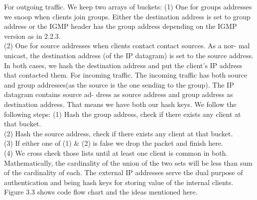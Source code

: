 \documentclass[11pt,left=2cm,bottom=2cm,oneside]{book}
\begin{document}
For outgoing traffic. We keep two arrays of buckets:
(1) One for groups addresses we snoop when clients join groups. Either the
destination address is set to group address or the IGMP header has the
group address depending on the IGMP version as in 2.2.3.\\
(2) One for source addresses when clients contact contact sources. As a nor-
mal unicast, the destination address (of the IP datagram) is set to the
source address.\\
In both cases, we hash the destination address and put the client's IP address that
contacted them.
For incoming traffic. The incoming traffic has both source and group addresses(as
the source is the one sending to the group). The IP datagram contains source ad-
dress as source address and group address as destination address. That means we
have both our hash keys. We follow the following steps:
(1) Hash the group address, check if there exists any client at that bucket.\\
(2) Hash the source address, check if there exists any client at that bucket.\\
(3) If either one of (1) \& (2) is false we drop the packet and finish here.\\
(4) We cross check those lists until at least one client is common in both.\\
Mathematically, the cardinality of the union of the two sets will be less
than sum of the cardinality of each.
The external IP addresses serve the dual purpose of authentication and being hash
keys for storing value of the internal clients.
Figure 3.3 shows code flow chart and the ideas mentioned here.
\end{document}
